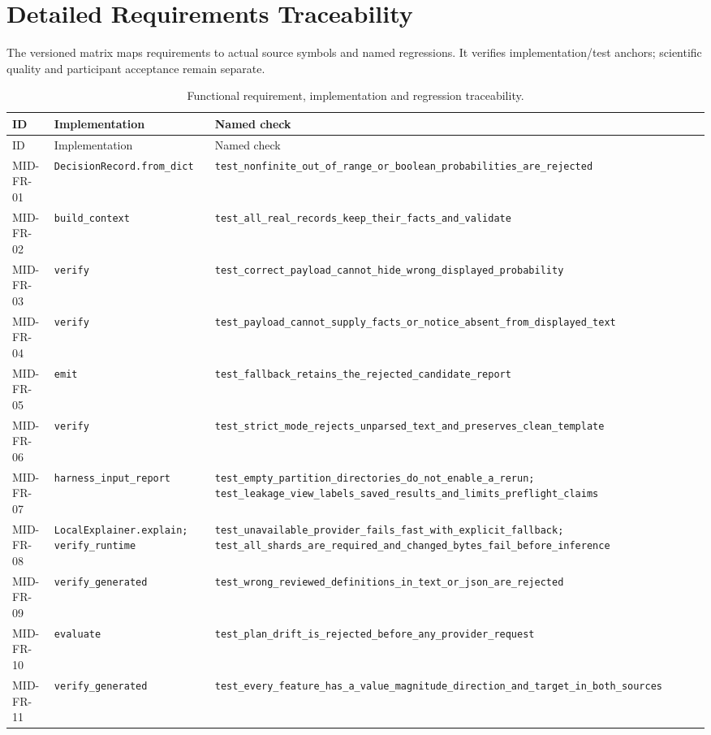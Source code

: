 \chapter{Detailed Requirements Traceability}
\label{app:requirements}
The versioned matrix maps requirements to actual source symbols and named regressions. It verifies implementation/test anchors; scientific quality and participant acceptance remain separate.
\begingroup\small
\begin{longtable}{p{}p{}p{}}
\caption{Functional requirement, implementation and regression traceability.}\label{tab:traceability}\\
\toprule ID & Implementation & Named check\\\midrule
\endfirsthead
\toprule ID & Implementation & Named check\\\midrule
\endhead
MID-FR-01 & \nolinkurl{DecisionRecord.from_dict} & \nolinkurl{test_nonfinite_out_of_range_or_boolean_probabilities_are_rejected}\\
MID-FR-02 & \nolinkurl{build_context} & \nolinkurl{test_all_real_records_keep_their_facts_and_validate}\\
MID-FR-03 & \nolinkurl{verify} & \nolinkurl{test_correct_payload_cannot_hide_wrong_displayed_probability}\\
MID-FR-04 & \nolinkurl{verify} & \nolinkurl{test_payload_cannot_supply_facts_or_notice_absent_from_displayed_text}\\
MID-FR-05 & \nolinkurl{emit} & \nolinkurl{test_fallback_retains_the_rejected_candidate_report}\\
MID-FR-06 & \nolinkurl{verify} & \nolinkurl{test_strict_mode_rejects_unparsed_text_and_preserves_clean_template}\\
MID-FR-07 & \nolinkurl{harness_input_report} & \nolinkurl{test_empty_partition_directories_do_not_enable_a_rerun; test_leakage_view_labels_saved_results_and_limits_preflight_claims}\\
MID-FR-08 & \nolinkurl{LocalExplainer.explain; verify_runtime} & \nolinkurl{test_unavailable_provider_fails_fast_with_explicit_fallback; test_all_shards_are_required_and_changed_bytes_fail_before_inference}\\
MID-FR-09 & \nolinkurl{verify_generated} & \nolinkurl{test_wrong_reviewed_definitions_in_text_or_json_are_rejected}\\
MID-FR-10 & \nolinkurl{evaluate} & \nolinkurl{test_plan_drift_is_rejected_before_any_provider_request}\\
MID-FR-11 & \nolinkurl{verify_generated} & \nolinkurl{test_every_feature_has_a_value_magnitude_direction_and_target_in_both_sources}\\

\end{longtable}
